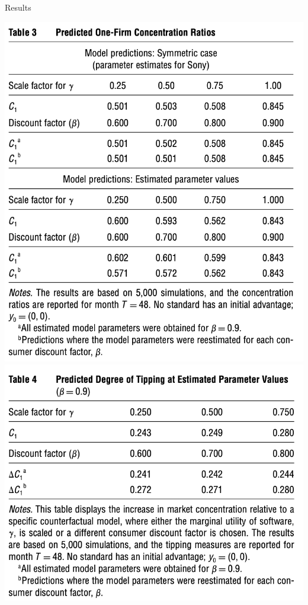 \documentclass[aspectratio=169,11pt]{beamer}
\begin{document}
\begin{frame}{Results}
\begin{center}
\includegraphics[scale=0.65]{resources/dube-table3}
\includegraphics[scale=0.65]{resources/dube-table4}\\
\end{center}
\end{frame}
\end{document}
